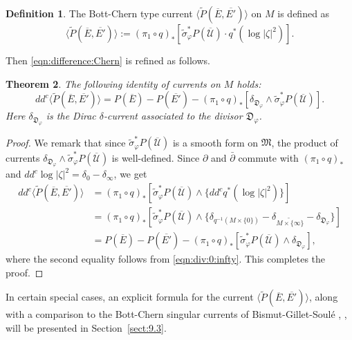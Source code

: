 \documentclass[amscd, leqno]{amsart}
\theoremstyle{plain}
\newtheorem{theorem}{Theorem}[section]
\theoremstyle{definition}
\newtheorem{definition}[theorem]{Definition}
\theoremstyle{remark}
\newenvironment{pf}{\begin{proof}}{\end{proof}}
\begin{document}
\begin{definition}
\label{def:canonical:ext}
The Bott-Chern type current $\langle \widetilde{P}(\overline{E},\overline{E'}) \rangle$ on $M$ is defined as
$$
\langle \widetilde{P}(\overline{E},\overline{E'}) \rangle 
:= 
(\pi_{1}\circ q)_{*}[\widetilde{\sigma}_{\varphi}^{*} P(\overline{\mathscr U})\cdot q^{*}(\log|\zeta|^{2})].
$$ 
\end{definition}


Then \eqref{eqn:difference:Chern} is refined as follows.


\begin{theorem}
\label{thm:canonical:ext}
The following identity of currents on $M$ holds:
$$
dd^{c} \langle \widetilde{P}(\overline{E},\overline{E'}) \rangle
=
P(\overline{E}) - P(\overline{E'}) 
- (\pi_{1}\circ q)_{*}\left[ \delta_{{\mathfrak D}_{\varphi}}\wedge\widetilde{\sigma}_{\varphi}^{*} P(\overline{\mathscr U}) \right].
$$
Here $\delta_{{\mathfrak D}_{\varphi}}$ is the Dirac $\delta$-current associated to the divisor ${\mathfrak D}_{\varphi}$.
\end{theorem}

\begin{pf}
We remark that since $\widetilde{\sigma}_{\varphi}^{*}P(\overline{\mathscr U})$ is a smooth form on ${\mathfrak M}$, the product of currents
$\delta_{{\mathfrak D}_{\varphi}}\wedge\widetilde{\sigma}_{\varphi}^{*}P(\overline{\mathscr U})$ is well-defined.
Since $\partial$ and $\bar{\partial}$ commute with $(\pi_{1}\circ q)_{*}$ and $dd^{c} \log |\zeta|^{2} = \delta_{0} - \delta_{\infty}$, we get 
$$
\begin{aligned}
dd^{c} \langle \widetilde{P}(\overline{E},\overline{E'}) \rangle
&=(\pi_{1}\circ q)_{*}\left[\widetilde{\sigma}_{\varphi}^{*}P(\overline{\mathscr U})\wedge\{dd^{c}q^{*}(\log|\zeta|^{2})\}\right]
\\
&=
(\pi_{1}\circ q)_{*}\left[\widetilde{\sigma}_{\varphi}^{*}P(\overline{\mathscr U})\wedge
\{ \delta_{q^{-1}(M\times\{0\})} - \delta_{\widetilde{M\times\{\infty\}}} - \delta_{{\mathfrak D}_{\varphi}} \}  \right]
\\
&= P(\overline{E}) - P(\overline{E'}) 
- (\pi_{1}\circ q)_{*}\left[\widetilde{\sigma}_{\varphi}^{*}P(\overline{\mathscr U})\wedge\delta_{{\mathfrak D}_{\varphi}}\right],
\end{aligned}
$$
where the second equality follows from \eqref{eqn:div:0:infty}. This completes the proof.
\end{pf}


In certain special cases, an explicit formula for the current $\langle \widetilde{P}(\overline{E},\overline{E'}) \rangle$, 
along with a comparison to the Bott-Chern singular currents of Bismut-Gillet-Soul\'e \cite{BGS90}, \cite{BGS90b}, 
will be presented in Section~\ref{sect:9.3}.
\end{document}

